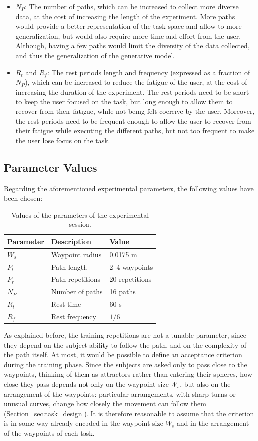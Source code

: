 \documentclass[12pt]{report}
\begin{document}
\begin{itemize}
    \item $N_P$: The number of paths, which can be increased to collect more diverse data, at the cost of increasing the length of the experiment. More paths would provide a better representation of the task space and allow to more generalization, but would also require more time and effort from the user. Although, having a few paths would limit the diversity of the data collected, and thus the generalization of the generative model.
    \item $R_t$ and $R_f$: The rest periods length and frequency (expressed as a fraction of $N_P$), which can be increased to reduce the fatigue of the user, at the cost of increasing the duration of the experiment. The rest periods need to be short to keep the user focused on the task, but long enough to allow them to recover from their fatigue, while not being felt coercive by the user. Moreover, the rest periods need to be frequent enough to allow the user to recover from their fatigue while executing the different paths, but not too frequent to make the user lose focus on the task. 
\end{itemize}

\subsection{Parameter Values}
Regarding the aforementioned experimental parameters, the following values have been chosen: 

\begin{table}[h!]
    \centering
    \caption{Values of the parameters of the experimental session.}
    \label{tab:session_parameters}
    \begin{tabular}{lll}
    \toprule
    Parameter & Description & Value \\
    \midrule
    $W_s$ & Waypoint radius & 0.0175 m \\
    $P_l$ & Path length & 2--4 waypoints \\
    $P_r$ & Path repetitions & 20 repetitions \\
    $N_P$ & Number of paths & 16 paths \\
    $R_t$ & Rest time & 60 s \\
    $R_f$ & Rest frequency & $1/6$ \\
    \bottomrule
\end{tabular}
\end{table}
As explained before, the training repetitions are not a tunable parameter, since they depend on the subject ability to follow the path, and on the complexity of the path itself. At most, it would be possible to define an acceptance criterion during the training phase. Since the subjects are asked only to pass close to the waypoints, thinking of them as attractors rather than entering their spheres, how close they pass depends not only on the waypoint size $W_s$, but also on the arrangement of the waypoints: particular arrangements, with sharp turns or unusual curves, change how closely the movement can follow them (Section~\ref{sec:task_design}). It is therefore reasonable to assume that the criterion is in some way already encoded in the waypoint size $W_s$ and in the arrangement of the waypoints of each task.
\end{document}
